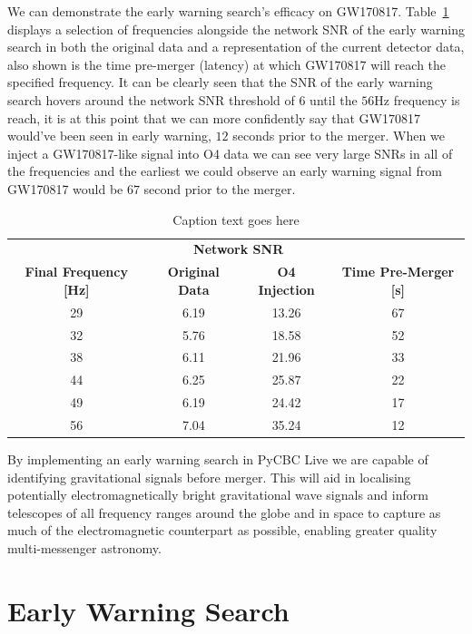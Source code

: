 We can demonstrate the early warning search's efficacy on GW170817. Table~\ref{6:tab:gw170817_early_warning} displays a selection of frequencies alongside the network SNR of the early warning search in both the original data and a representation of the current detector data, also shown is the time pre-merger (latency) at which GW170817 will reach the specified frequency. It can be clearly seen that the SNR of the early warning search hovers around the network SNR threshold of $6$ until the $56$Hz frequency is reach, it is at this point that we can more confidently say that GW170817 would've been seen in early warning, $12$ seconds prior to the merger. When we inject a GW170817-like signal into O4 data we can see very large SNRs in all of the frequencies and the earliest we could observe an early warning signal from GW170817 would be $67$ second prior to the merger.
%
\begin{table}[ht]
    \centering
    \setlength{\tabcolsep}{4pt}
    \begin{tabular}{cccc}
        \toprule
        & \multicolumn{2}{c}{\textbf{Network SNR}} & \\
        \cmidrule(lr){1-4}
        \textbf{Final Frequency [Hz]} & \textbf{Original Data} & \textbf{O4 Injection} & \textbf{Time Pre-Merger [s]} \\
        \midrule
        29 & 6.19 & 13.26 & 67 \\
        32 & 5.76 & 18.58 & 52 \\
        38 & 6.11 & 21.96 & 33 \\
        44 & 6.25 & 25.87 & 22 \\
        49 & 6.19 & 24.42 & 17 \\
        56 & 7.04 & 35.24 & 12 \\
        \bottomrule
    \end{tabular}
    \caption{Caption text goes here}
    \label{6:tab:gw170817_early_warning}
\end{table}
%
By implementing an early warning search in PyCBC Live we are capable of identifying gravitational signals before merger. This will aid in localising potentially electromagnetically bright gravitational wave signals and inform telescopes of all frequency ranges around the globe and in space to capture as much of the electromagnetic counterpart as possible, enabling greater quality multi-messenger astronomy.

\section{Early Warning Search}

